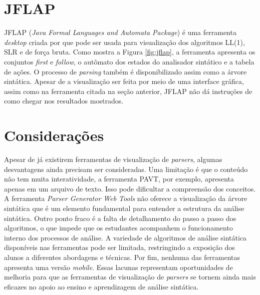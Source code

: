 \section{JFLAP}
JFLAP (\textit{Java Formal Languages and Automata Package}) é uma ferramenta \textit{desktop} criada por \textcite{jflap} que pode ser usada para visualização dos algoritmos LL(1), SLR e de força bruta. Como mostra a Figura \ref{fig:jflap}, a ferramenta apresenta os conjuntos \textit{first} e \textit{follow}, o autômato dos estados do analisador sintático e a tabela de ações. O processo de \textit{parsing} também é disponibilizado assim como a árvore sintática. Apesar de a visualização ser feita por meio de uma interface gráfica, assim como na ferramenta citada na seção anterior, JFLAP não dá instruções de como chegar nos resultados mostrados.

\section{Considerações}
Apesar de já existirem ferramentas de visualização de \textit{parsers}, algumas desvantagens ainda precisam ser consideradas. Uma limitação é que o conteúdo não tem muita interatividade, a ferramenta PAVT, por exemplo, apresenta apenas em um arquivo de texto. Isso pode dificultar a compreensão dos conceitos. A ferramenta \textit{Parser Generator Web Tools} não oferece a visualização da árvore sintática que é um elemento fundamental para entender a estrutura da análise sintática. Outro ponto fraco é a falta de detalhamento do passo a passo dos algoritmos, o que impede que os estudantes acompanhem o funcionamento interno dos processos de análise. A variedade de algoritmos de análise sintática disponíveis nas ferramentas pode ser limitada, restringindo a exposição dos alunos a diferentes abordagens e técnicas. Por fim, nenhuma das ferramentas apresenta uma versão \textit{mobile}. Essas lacunas representam oportunidades de melhoria para que as ferramentas de visualização de \textit{parsers} se tornem ainda mais eficazes no apoio ao ensino e aprendizagem de análise sintática.

